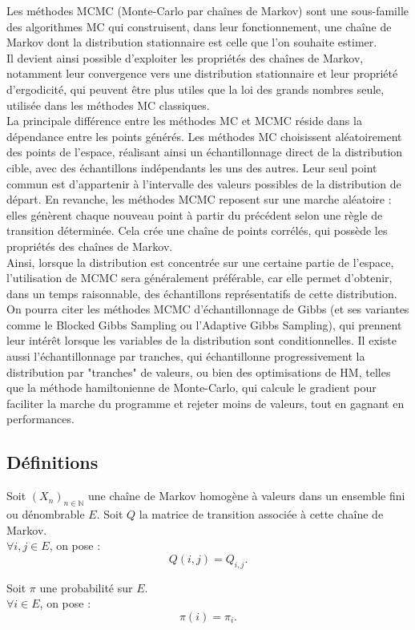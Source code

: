 \documentclass{article}
\begin{document}
Les méthodes MCMC (Monte-Carlo par chaînes de Markov) sont une sous-famille des algorithmes MC qui construisent, dans leur fonctionnement, une chaîne de Markov dont la distribution stationnaire est celle que l'on souhaite estimer. \\
Il devient ainsi possible d'exploiter les propriétés des chaînes de Markov, notamment leur convergence vers une distribution stationnaire et leur propriété d'ergodicité, qui peuvent être plus utiles que la loi des grands nombres seule, utilisée dans les méthodes MC classiques. \\
La principale différence entre les méthodes MC et MCMC réside dans la dépendance entre les points générés. Les méthodes MC choisissent aléatoirement des points de l'espace, réalisant ainsi un échantillonnage direct de la distribution cible, avec des échantillons indépendants les uns des autres. Leur seul point commun est d'appartenir à l'intervalle des valeurs possibles de la distribution de départ. En revanche, les méthodes MCMC reposent sur une marche aléatoire : elles génèrent chaque nouveau point à partir du précédent selon une règle de transition déterminée. Cela crée une chaîne de points corrélés, qui possède les propriétés des chaînes de Markov. \\
Ainsi, lorsque la distribution est concentrée sur une certaine partie de l'espace, l'utilisation de MCMC sera généralement préférable, car elle permet d'obtenir, dans un temps raisonnable, des échantillons représentatifs de cette distribution. \\

On pourra citer les méthodes MCMC d'échantillonnage de Gibbs (et ses variantes comme le Blocked Gibbs Sampling ou l'Adaptive Gibbs Sampling), qui prennent leur intérêt lorsque les variables de la distribution sont conditionnelles. Il existe aussi l'échantillonnage par tranches, qui échantillonne progressivement la distribution par "tranches" de valeurs, ou bien des optimisations de HM, telles que la méthode hamiltonienne de Monte-Carlo, qui calcule le gradient pour faciliter la marche du programme et rejeter moins de valeurs, tout en gagnant en performances. \\

\subsection{Définitions}

\begin{tcolorbox}[colback=white,colframe=blue!80!black,title=Notations]
Soit $(X_n)_{n \in \mathbb{N}}$ une chaîne de Markov homogène à valeurs dans un ensemble fini ou dénombrable $E$.
Soit $Q$ la matrice de transition associée à cette chaîne de Markov. \\

$\forall i, j \in E$, on pose :
\[
Q(i,j) = Q_{i,j}.
\]
\vspace{1mm}

Soit $\pi$ une probabilité sur $E$. \\

$\forall i \in E$, on pose :
\[
\pi(i) = \pi_i.
\]
\end{tcolorbox}
\end{document}

